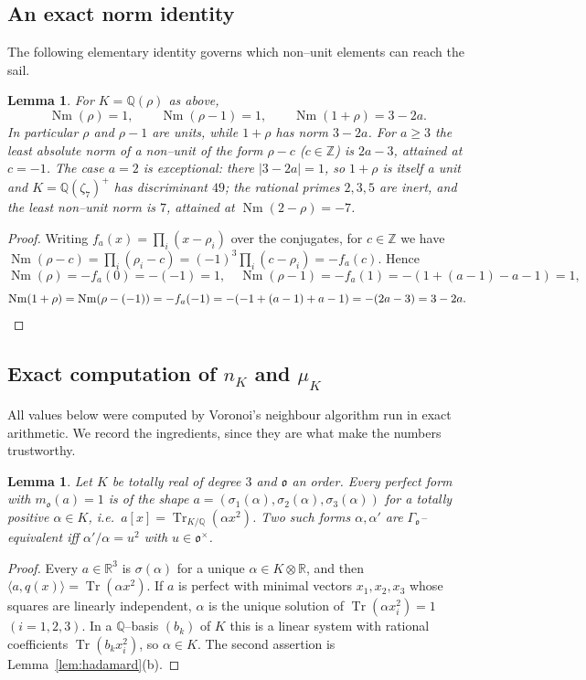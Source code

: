 \documentclass[11pt,reqno]{amsart}
\theoremstyle{plain}
\newtheorem{lemma}[theorem]{Lemma}
\theoremstyle{definition}
\newcommand{\Z}{\mathbb{Z}}
\newcommand{\Q}{\mathbb{Q}}
\newcommand{\R}{\mathbb{R}}
\newcommand{\Nm}{\operatorname{Nm}}
\newcommand{\Tr}{\operatorname{Tr}}
\newcommand{\Ok}{\mathfrak{o}}
\newcommand{\nK}{n_K}
\newcommand{\muK}{\mu_K}
\begin{document}
\subsection{An exact norm identity}
The following elementary identity governs which non--unit elements can reach the sail.

\begin{lemma}\label{lem:enola-norm}
For $K=\Q(\rho)$ as above,
\[
\Nm(\rho)=1,\qquad \Nm(\rho-1)=1,\qquad \Nm(1+\rho)=3-2a .
\]
In particular $\rho$ and $\rho-1$ are units, while $1+\rho$ has norm $3-2a$. For $a\ge3$ the least
absolute norm of a non--unit of the form $\rho-c$ \textup{(}$c\in\Z$\textup{)} is $2a-3$, attained at $c=-1$. The case $a=2$ is exceptional: there $|3-2a|=1$, so $1+\rho$ is itself a unit and
$K=\Q(\zeta_7)^+$ has discriminant $49$; the rational primes $2,3,5$ are inert, and the least non--unit
norm is $7$, attained at $\Nm(2-\rho)=-7$.
\end{lemma}

\begin{proof}
Writing $f_a(x)=\prod_{i}(x-\rho_i)$ over the conjugates, for $c\in\Z$ we have
$\Nm(\rho-c)=\prod_i(\rho_i-c)=(-1)^3\prod_i(c-\rho_i)=-f_a(c)$. Hence
\[
\Nm(\rho)=-f_a(0)=-(-1)=1,\quad
\Nm(\rho-1)=-f_a(1)=-(1+(a-1)-a-1)=1,
\]
\[
\Nm(1+\rho)=\Nm(\rho-(-1))=-f_a(-1)=-(-1+(a-1)+a-1)=-(2a-3)=3-2a. \qedhere
\]
\end{proof}

\subsection{Exact computation of $\nK$ and $\muK$}\label{sec:voronoi}
All values below were computed by Voronoi's neighbour algorithm run in exact arithmetic. We record the
ingredients, since they are what make the numbers trustworthy.

\begin{lemma}\label{lem:rational}
Let $K$ be totally real of degree $3$ and $\Ok$ an order. Every perfect form with $m_\Ok(a)=1$ is of the
shape $a=(\sigma_1(\alpha),\sigma_2(\alpha),\sigma_3(\alpha))$ for a totally positive $\alpha\in K$, i.e.\
$a[x]=\Tr_{K/\Q}(\alpha x^2)$. Two such forms $\alpha,\alpha'$ are $\Gamma_\Ok$--equivalent iff
$\alpha'/\alpha=u^2$ with $u\in\Ok^\times$.
\end{lemma}

\begin{proof}
Every $a\in\R^3$ is $\sigma(\alpha)$ for a unique $\alpha\in K\otimes\R$, and then
$\langle a,q(x)\rangle=\Tr(\alpha x^2)$. If $a$ is perfect with minimal vectors $x_1,x_2,x_3$ whose squares
are linearly independent, $\alpha$ is the unique solution of $\Tr(\alpha x_i^2)=1$ $(i=1,2,3)$. In a
$\Q$--basis $(b_k)$ of $K$ this is a linear system with rational coefficients $\Tr(b_kx_i^2)$, so $\alpha\in K$.
The second assertion is Lemma~\ref{lem:hadamard}(b).
\end{proof}
\end{document}
